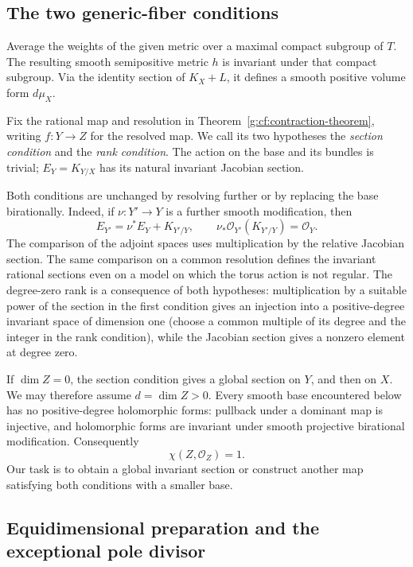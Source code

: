\subsection{The two generic-fiber conditions}
\label{g:cf:generic-conditions}

Average the weights of the given metric over a maximal compact subgroup of
$T$.  The resulting smooth semipositive metric $h$ is invariant under that
compact subgroup.  Via the identity section of $K_X+L$, it defines a smooth
positive volume form $d\mu_X$.

Fix the rational map and resolution in Theorem~\ref{g:cf:contraction-theorem},
writing $f:Y\to Z$ for the resolved map. We call its two hypotheses the
\emph{section condition} and the \emph{rank condition}. The action on the
base and its bundles is trivial; $E_Y=K_{Y/X}$ has its natural invariant
Jacobian section.

Both conditions are unchanged by resolving further or by replacing the
base birationally.  Indeed, if $\nu:Y'\to Y$ is a further smooth
modification, then
\[
 E_{Y'}=\nu^*E_Y+K_{Y'/Y},
 \qquad \nu_*\mathcal O_{Y'}(K_{Y'/Y})=\mathcal O_Y.
\]
The comparison of the adjoint spaces uses multiplication by the relative
Jacobian section.  The same comparison on a common resolution defines the
invariant rational sections even on a model on which the torus action is
not regular.  The degree-zero rank is a consequence of both hypotheses: multiplication by a
suitable power of the section in the first condition gives an injection
into a positive-degree invariant space of dimension one (choose a common
multiple of its degree and the integer in the rank condition), while the
Jacobian section gives a nonzero element at degree zero.

If $\dim Z=0$, the section condition gives a global section on $Y$, and
then on $X$.  We may therefore assume $d=\dim Z>0$.  Every smooth base
encountered below has no positive-degree holomorphic forms: pullback
under a dominant map is injective, and holomorphic forms are invariant
under smooth projective birational modification.  Consequently
\begin{equation}\label{g:cf:euler}
 \chi(Z,\mathcal O_Z)=1.
\end{equation}
Our task is to obtain a global invariant section or construct another
map satisfying both conditions with a smaller base.

\subsection{Equidimensional preparation and the exceptional pole divisor}
\label{g:cf:preparation}

